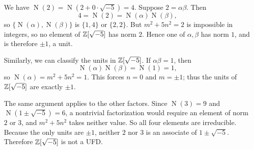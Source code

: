 \documentclass[reqno,11pt]{amsart}
\newcommand{\Nm}{\operatorname{N}}
\begin{document}
\begin{example}[$2$ is irreducible]
We have $\Nm(2)=\Nm(2+0\cdot\sqrt{-5})=4$. Suppose $2=\alpha\beta$.
Then
\[
  4=\Nm(2)=\Nm(\alpha)\Nm(\beta),
\]
so $\{\Nm(\alpha),\Nm(\beta)\}$ is $\{1,4\}$ or $\{2,2\}$. But
$m^2+5n^2=2$ is impossible in integers, so no element of
$\mathbb{Z}[\sqrt{-5}]$ has norm $2$. Hence one of $\alpha,\beta$ has norm
$1$, and is therefore $\pm1$, a unit.
\end{example}

Similarly, we can classify the units in $\mathbb{Z}[\sqrt{-5}]$. If
$\alpha\beta=1$, then
\[
  \Nm(\alpha)\Nm(\beta)=\Nm(1)=1,
\]
so $\Nm(\alpha)=m^2+5n^2=1$. This forces $n=0$ and $m=\pm1$; thus
the units of $\mathbb{Z}[\sqrt{-5}]$ are exactly $\pm1$.

\begin{remark}
The same argument applies to the other factors. Since
$\Nm(3)=9$ and $\Nm(1\pm\sqrt{-5})=6$, a nontrivial factorization
would require an element of norm $2$ or $3$, and $m^2+5n^2$ takes
neither value. So all four elements are irreducible. Because the
only units are $\pm1$, neither $2$ nor $3$ is an associate of
$1\pm\sqrt{-5}$. Therefore $\mathbb{Z}[\sqrt{-5}]$ is not a UFD.
\end{remark}
\end{document}
